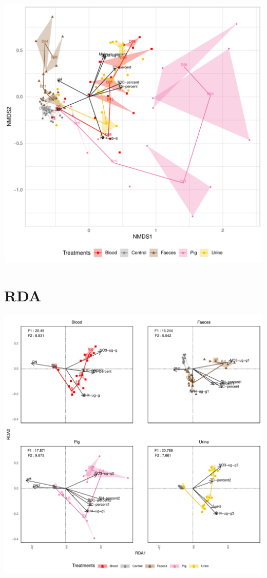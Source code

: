 \documentclass[11pt,english]{article}\usepackage[]{graphicx}\usepackage{xcolor}
\makeatletter
\def\maxwidth{ %
  \ifdim\Gin@nat@width>\linewidth
    \linewidth
  \else
    \Gin@nat@width
  \fi
}
\newenvironment{knitrout}{}{} %
\makeatother
\begin{document}
\begin{knitrout}
\color{fgcolor}
\includegraphics[width=\maxwidth]{figure/image-nmds-1} 

\end{knitrout}


\section{RDA}


\begin{knitrout}
\color{fgcolor}
\includegraphics[width=\maxwidth]{figure/image-rda-1} 

\end{knitrout}
\end{document}
